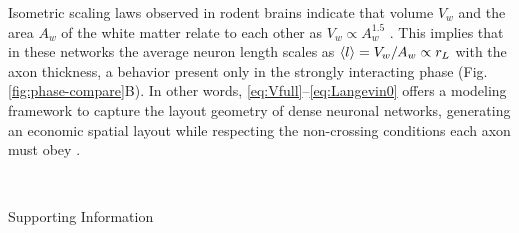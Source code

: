 \documentclass[endfloats,nofootinbib,preprint,floatfix,titlepage,superscriptaddress]{revtex4} %
\newcommand{\finV}[2]{#1}
\begin{document}
Isometric scaling laws observed in rodent brains \cite{herculano2012remarkable} indicate that volume $V_w$ and the area $A_w$ of the white matter relate to each other as $V_w\propto A_w^{1.5}$ \cite{herculano2012remarkable}. 
This implies that in these networks the average neuron length scales as $ \left<l\right> = V_w/A_w \propto r_L $ with the axon thickness, a behavior present only in the strongly interacting phase %
(Fig. \ref{fig:phase-compare}B). 
In other words,  \eqref{eq:Vfull}--\eqref{eq:Langevin0} offers a modeling framework to capture the layout geometry of dense neuronal networks, generating an economic spatial layout %
\cite{bullmore2012economy,sporns2004organization} while respecting the non-crossing conditions each axon must obey \cite{kasthuri12015saturated}.


% 
% 


\finV{


}{}
\newpage
\newpage




~
\newpage


\renewcommand{\thesection}{SI \arabic{section}}
\setcounter{page}{1}
\setcounter{figure}{0}
\centerline{\Huge Supporting Information}
\end{document}
